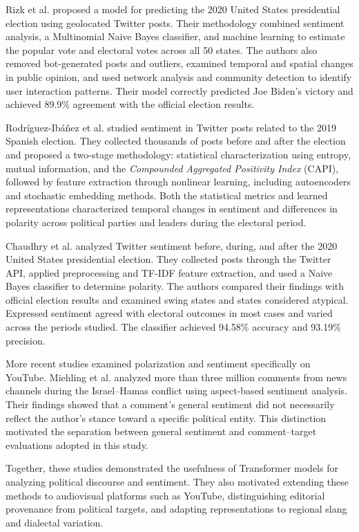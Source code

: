 \documentclass[conference,letterpaper]{IEEEtran}
\begin{document}
Rizk et al. \cite{rizk2023predicting} proposed a model for predicting the 2020 United States presidential election using geolocated Twitter posts. Their methodology combined sentiment analysis, a Multinomial Naive Bayes classifier, and machine learning to estimate the popular vote and electoral votes across all 50 states. The authors also removed bot-generated posts and outliers, examined temporal and spatial changes in public opinion, and used network analysis and community detection to identify user interaction patterns. Their model correctly predicted Joe Biden's victory and achieved 89.9\% agreement with the official election results.

Rodríguez-Ibáñez et al. \cite{rodriguez2021sentiment} studied sentiment in Twitter posts related to the 2019 Spanish election. They collected thousands of posts before and after the election and proposed a two-stage methodology: statistical characterization using entropy, mutual information, and the \textit{Compounded Aggregated Positivity Index} (CAPI), followed by feature extraction through nonlinear learning, including autoencoders and stochastic embedding methods. Both the statistical metrics and learned representations characterized temporal changes in sentiment and differences in polarity across political parties and leaders during the electoral period.

Chaudhry et al. \cite{chaudhry2022sentiment} analyzed Twitter sentiment before, during, and after the 2020 United States presidential election. They collected posts through the Twitter API, applied preprocessing and TF-IDF feature extraction, and used a Naive Bayes classifier to determine polarity. The authors compared their findings with official election results and examined swing states and states considered atypical. Expressed sentiment agreed with electoral outcomes in most cases and varied across the periods studied. The classifier achieved 94.58\% accuracy and 93.19\% precision.

More recent studies examined polarization and sentiment specifically on YouTube. Miehling et al. \cite{Miehling2025} analyzed more than three million comments from news channels during the Israel--Hamas conflict using aspect-based sentiment analysis. Their findings showed that a comment's general sentiment did not necessarily reflect the author's stance toward a specific political entity. This distinction motivated the separation between general sentiment and comment--target evaluations adopted in this study.

Together, these studies demonstrated the usefulness of Transformer models for analyzing political discourse and sentiment. They also motivated extending these methods to audiovisual platforms such as YouTube, distinguishing editorial provenance from political targets, and adapting representations to regional slang and dialectal variation.
\end{document}
